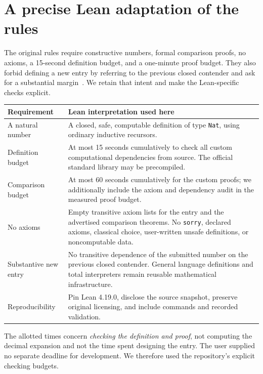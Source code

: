\documentclass[11pt,letterpaper]{article}
\theoremstyle{definition}
\newcommand{\code}[1]{\texttt{#1}}
\begin{document}
\section{A precise Lean adaptation of the rules}

The original rules require constructive numbers, formal comparison proofs,
no axioms, a 15-second definition budget, and a one-minute proof budget. They
also forbid defining a new entry by referring to the previous closed
contender and ask for a substantial margin~\cite{rules}. We retain that intent
and make the Lean-specific checks explicit.

\begin{center}
\begin{tabularx}{\textwidth}{@{}p{}X@{}}
\toprule
Requirement & Lean interpretation used here\\
\midrule
A natural number & A closed, safe, computable definition of type \code{Nat},
using ordinary inductive recursors.\\[3pt]
Definition budget & At most 15 seconds cumulatively to check all custom
computational dependencies from source. The official standard library may be
precompiled.\\[3pt]
Comparison budget & At most 60 seconds cumulatively for the custom proofs;
we additionally include the axiom and dependency audit in the measured proof
budget.\\[3pt]
No axioms & Empty transitive axiom lists for the entry and the advertised
comparison theorems. No \code{sorry}, declared axioms, classical choice,
user-written unsafe definitions, or noncomputable data.\\[3pt]
Substantive new entry & No transitive dependence of the submitted number on
the previous closed contender. General language definitions and total
interpreters remain reusable mathematical infrastructure.\\[3pt]
Reproducibility & Pin Lean 4.19.0, disclose the source snapshot, preserve
original licensing, and include commands and recorded validation.\\
\bottomrule
\end{tabularx}
\end{center}

The allotted times concern \emph{checking the definition and proof}, not
computing the decimal expansion and not the time spent designing the entry.
The user supplied no separate deadline for development. We therefore used the
repository's explicit checking budgets.
\end{document}
